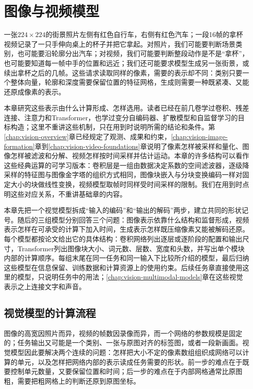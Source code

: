 \chapter{图像与视频模型}
\label{chap:vision-image-video-models}

一张$224\times224$的街景照片左侧有红色自行车，右侧有红色汽车；一段16帧的拿杯视频记录了一只手伸向桌上的杯子并把它拿起。对照片，我们可能要判断场景类别，也可能要沿轮廓分出汽车；对视频，我们可能要判断整段动作是不是“拿杯”，也可能要知道每一帧中手的位置和远近；我们还可能要求模型生成另一张街景，或续出拿杯之后的几帧。这些请求读取同样的像素，需要的表示却不同：类别只要一个整体向量，轮廓和深度需要保留位置的特征网格，生成则需要一种既紧凑、又能还原成像素的表示。

本章研究这些表示由什么计算形成、怎样选用。读者已经在前几卷学过卷积、残差连接、注意力和Transformer，也学过变分自编码器、扩散模型和自监督学习的目标构造；这里不重讲这些机制，只在用到时说明所需的结论和条件。第\ref{chap:vision-overview}章已经规定了观测、成果和约束，\ref{chap:vision-image-formation}章到\ref{chap:vision-video-foundations}章说明了像素怎样被采样和量化、图像怎样被滤波和分解、视频怎样按时间采样并估计运动。本章的许多结构可以看作这些经典运算的可学习版本：卷积层是一组由数据决定系数的空间滤波器，逐级降采样的特征图与图像金字塔的组织方式相同，图像块嵌入与分块变换编码一样对固定大小的块做线性变换，视频模型取帧时同样受时间采样的限制。我们在用到时点明这些对应关系，不重讲基础章的内容。

本章先把一个视觉模型拆成“输入的编码”和“输出的解码”两步，建立共同的形状记号。随后的三组模型分别回答三个问题：图像表示依靠什么结构和监督形成，视频表示怎样在可承受的计算下加入时间，生成表示怎样既压缩像素又能被解码还原。每个模型都按论文给出它的具体结构：卷积网络列出逐层或逐阶段的配置和输出尺寸，Transformer列出图像块大小、词元数、层数、宽度和头数，并写出单个模块内部的计算顺序。每组末尾在同一任务和同一输入下比较所介绍的模型，最后归纳这些模型在信息保留、训练数据和计算资源上的使用约束。后续任务章直接使用这里的模型，只说明任务中的用法；\ref{chap:vision-multimodal-models}章在这些视觉表示之上连接文字和声音。

\section{视觉模型的计算流程}
\label{sec:vision-ivm-pipeline}

图像的高宽因照片而异，视频的帧数因录像而异，而一个网络的参数规模是固定的；任务输出又可能是一个类别、一张与原图对齐的标签图，或者一段新画面。视觉模型因此要解决两个连续的问题：怎样把大小不定的像素数组组织成网络可以计算的单元，以及怎样把网络内部的表示读成任务需要的形状。前一步的难点在于既要控制单元数量，又要保留位置和时间；后一步的难点在于内部网格通常比原图粗，需要把粗网格上的判断还原到原图坐标。

